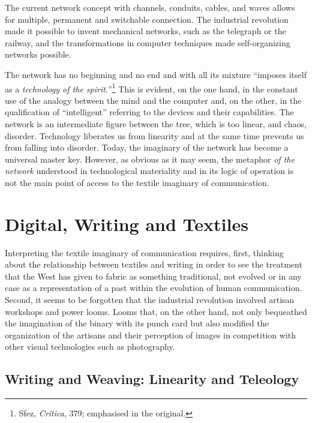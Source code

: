 \documentclass{tufte-handout}
\begin{document}
The current network concept with channels, conduits, cables, and waves
allows for multiple, permanent and switchable connection. The industrial
revolution made it possible to invent mechanical networks, such as the
telegraph or the railway, and the transformations in computer techniques
made self-organizing networks possible.

\newpage The network has no beginning and no end and with all its mixture
``imposes itself as a \emph{technology of the spirit.}''\footnote{Sfez,
  \emph{Crítica}, 379; emphasised in the original.} This is evident, on
the one hand, in the constant use of the analogy between the mind and
the computer and, on the other, in the qualification of ``intelligent''
referring to the devices and their capabilities. The network is an
intermediate figure between the tree, which is too linear, and chaos,
disorder. Technology liberates us from linearity and at the same time
prevents us from falling into disorder. Today, the imaginary of the
network has become a universal master key. However, as obvious as it may
seem, the metaphor \emph{of the network} understood in technological
materiality and in its logic of operation is not the main point of
access to the textile imaginary of communication.

\hypertarget{digital-writing-and-textiles.}{%
\section{Digital, Writing and
Textiles}\label{digital-writing-and-textiles.}}

Interpreting the textile imaginary of communication requires, first,
thinking about the relationship between textiles and writing in order to
see the treatment that the West has given to fabric as something
traditional, not evolved or in any case as a representation of a past
within the evolution of human communication. Second, it seems to be
forgotten that the industrial revolution involved artisan workshops and
power looms. Looms that, on the other hand, not only bequeathed the
imagination of the binary with its punch card but also modified the
organization of the artisans and their perception of images in
competition with other visual technologies such as photography.

\hypertarget{writing-and-weaving-linearity-and-teleology}{%
\subsection{Writing and Weaving: Linearity and
Teleology}\label{writing-and-weaving-linearity-and-teleology}}
\end{document}
